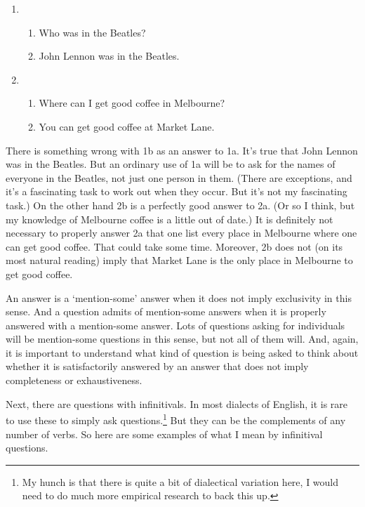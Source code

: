 \documentclass[11pt,]{book}
\providecommand{\tightlist}{%
  \setlength{\itemsep}{0pt}\setlength{\parskip}{0pt}}
\let\rmarkdownfootnote\footnote%
\def\footnote{\protect\rmarkdownfootnote}
\begin{document}
\begin{enumerate}
\def\labelenumi{\arabic{enumi}.}
\item
  \begin{enumerate}
  \def\labelenumii{\alph{enumii}.}
  \tightlist
  \item
    Who was in the Beatles?
  \item
    John Lennon was in the Beatles.
  \end{enumerate}
\item
  \begin{enumerate}
  \def\labelenumii{\alph{enumii}.}
  \tightlist
  \item
    Where can I get good coffee in Melbourne?
  \item
    You can get good coffee at Market Lane.
  \end{enumerate}
\end{enumerate}

There is something wrong with 1b as an answer to 1a. It's true that John Lennon was in the Beatles. But an ordinary use of 1a will be to ask for the names of everyone in the Beatles, not just one person in them. (There are exceptions, and it's a fascinating task to work out when they occur. But it's not my fascinating task.) On the other hand 2b is a perfectly good answer to 2a. (Or so I think, but my knowledge of Melbourne coffee is a little out of date.) It is definitely not necessary to properly answer 2a that one list every place in Melbourne where one can get good coffee. That could take some time. Moreover, 2b does not (on its most natural reading) imply that Market Lane is the only place in Melbourne to get good coffee.

An answer is a `mention-some' answer when it does not imply exclusivity in this sense. And a question admits of mention-some answers when it is properly answered with a mention-some answer. Lots of questions asking for individuals will be mention-some questions in this sense, but not all of them will. And, again, it is important to understand what kind of question is being asked to think about whether it is satisfactorily answered by an answer that does not imply completeness or exhaustiveness.

Next, there are questions with infinitivals. In most dialects of English, it is rare to use these to simply ask questions.\footnote{My hunch is that there is quite a bit of dialectical variation here, I would need to do much more empirical research to back this up.} But they can be the complements of any number of verbs. So here are some examples of what I mean by infinitival questions.
\end{document}
